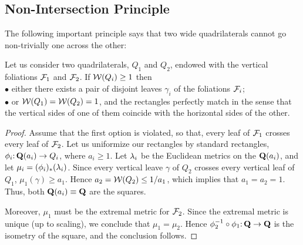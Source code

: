 \subsection{Non-Intersection Principle}\label{so principle}

The following important principle says that
two wide quadrilaterals cannot go non-trivially one across the other:

\begin{lem}\label{no crossing}
Let us consider two quadrilaterals, $Q_1$ and $Q_2$,
endowed with the vertical foliations ${\mathcal F}_1$ and ${\mathcal F}_2$.
If ${\mathcal W}(Q_i)\geq 1$ then \\
$\bullet$ either there exists a pair of disjoint leaves $\gamma_i$ of the foliations ${\mathcal F}_i$;\\
$\bullet$ or ${\mathcal W}(Q_1)={\mathcal W}(Q_2)=1$, and the rectangles perfectly match in the sense that
   the vertical sides of one of them coincide with the horizontal sides of the other.
\end{lem}


\begin{proof}
  Assume that the first option is violated,
so that, every leaf of ${\mathcal F}_1$ crosses every leaf of ${\mathcal F}_2$.
  Let us uniformize our rectangles by standard rectangles,
$\phi_i\mathpunct: {\mathbf{Q}}(a_i)\to Q_i$, where $a_i\geq 1$.
Let ${\lambda}_i$ be the Euclidean metrics on the ${\mathbf{Q}}(a_i)$,
and let $\mu_i= (\phi_i)_*({\lambda}_i)$.
Since every vertical leave $\gamma$ of $Q_2$ crosses every vertical leaf of $Q_1$,
$\mu_1(\gamma)\geq a_1$. Hence $a_2= {\mathcal W} (Q_2)\leq 1/a_1$,
which implies that $a_1=a_2=1$. Thus, both ${\mathbf{Q}}(a_i)\equiv {\mathbf{Q}}$ are the squares.

Moreover, $\mu_1$ must be the extremal metric for ${\mathcal F}_2$.
Since the extremal metric is unique (up to scaling), we conclude that
$\mu_1=\mu_2$. Hence $\phi_2^{-1}\circ \phi_1\mathpunct: {\mathbf{Q}} \to {\mathbf{Q}} $
is the isometry of  the square, and the conclusion follows.
\end{proof}

